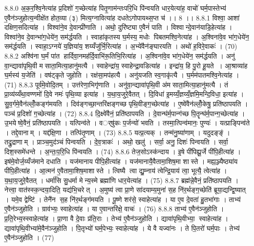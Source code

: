 8.8.0
अ॒क॒र॒श्वि॒नेत्या॑ह प्र॒दिशो॑ ग॒च्छेत्या॑ह पितृ॒णाम॑न्तःपरि॒धि पि॑न्वयति धार॒येत्या॑ह॒ वाचो॑ घर्म॒पास्तेभ्य॑ ए॒वैन॑ञ्जुहोत्य॒न्वीक्षे॑त होत॒व्या (३) मित्य॒ग्नावित्या॑ह दधतेऽगोपायथ्स॒प्त च॑ ।। 8 ।।
8.8.1
विश्वा॒ आशा॑ दक्षिण॒सदित्या॑ह । विश्वा॑ने॒व दे॒वान्प्री॑णाति । अथो॒ दुरि॑ष्ट्या ए॒वैनं॑ पाति । विश्वान्दे॒वान॑याडि॒हेत्या॑ह । विश्वा॑ने॒व दे॒वान्भा॑ग॒धेये॑न॒ सम॑र्द्धयति । स्वाहा॑कृतस्य घ॒र्मस्य॒ मधोः पिबतमश्वि॒नेत्या॑ह । अ॒श्विना॑वे॒व भा॑ग॒धेये॑न॒ सम॑र्द्धयति । स्वाहा॒ऽग्नये॑ य॒ज्ञिया॑य॒ शय्यँजु॑र्भि॒रित्या॑ह । अ॒भ्ये॑वैन॑ङ्घारयति । अथो॑ ह॒विरे॒वाकः॑ । (70)
8.8.2
अश्वि॑ना घ॒र्मं पा॑त हार्दिवा॒नमह॑र्दि॒वाभि॑रू॒तिभि॒रित्या॑ह । अ॒श्विना॑वे॒व भा॑ग॒धेये॑न॒ सम॑र्द्धयति । अनु॑ वा॒न्द्यावा॑पृथि॒वी मसाता॒मित्या॒हानु॑मत्यै । स्वाहेन्द्रा॑य॒ स्वाहेन्द्रा॒वडित्या॑ह । इन्द्रा॑य॒ हि पु॒रो हू॒यते । आ॒श्राव्या॑ह घ॒र्मस्य॑ य॒जेति॑ । वष॑ट्कृते जुहोति । रक्ष॑सा॒मप॑हत्यै । अनु॑यजति स्व॒गाकृ॑त्यै । घ॒र्मम॑पातमश्वि॒नेत्या॑ह । (71)
8.8.3
पूर्व॑मे॒वोदि॒तम् । उत्त॑रेणा॒भिगृ॑णाति । अनु॑वा॒न्द्यावा॑पृथि॒वी अ॑मसाता॒मित्या॒हानु॑मत्यै । तं प्रा॒व्य॑य्यँथा॒वण्णमो॑ दि॒वे नमः॑ पृथि॒व्या इत्या॑ह । य॒था॒य॒जुरे॒वैतत् । दि॒विधा॑ इ॒मय्यँ॒ज्ञय्यँ॒ज्ञमि॒मन्दि॒विधा॒ इत्या॑ह । सु॒व॒र्गमे॒वैन॑ल्लोँ॒कङ्ग॑मयति । दिव॑ङ्गच्छा॒न्तरि॑क्षङ्गच्छ पृथि॒वीङ्ग॒च्छेत्या॑ह । ए॒ष्वे॑वैन॑ल्लोँ॒केषु॒ प्रति॑ष्ठापयति । पञ्च॑ प्र॒दिशो॑ ग॒च्छेत्या॑ह । (72)
8.8.4
दि॒क्ष्वे॑वैनं॒ प्रति॑ष्ठापयति । दे॒वान्घ॑र्म॒पान्ग॑च्छ पि॒तॄन्घ॑र्म॒पान्ग॒च्छेत्या॑ह । उ॒भयेष्वे॒वैनं॒ प्रति॑ष्ठापयति । यत्पिन्व॑ते । वर््षु॑कः प॒र्जन्यो॑ भवति । तस्मा॒त्पिन्व॑मानः॒ पुण्यः॑ । यत्प्राङ्पिन्व॑ते । तद्दे॒वानाम् । यद्द॑क्षि॒णा । तत्पि॑तृ॒णाम् । (73)
8.8.5
यत्प्र॒त्यक् । तन्म॑नु॒ष्या॑णाम् । यदुदङ्ङ्॑ । तद्रु॒द्राणाम् । प्राञ्च॒मुद॑ञ्चं पिन्वयति । दे॒व॒त्राकः॑ । अथो॒ खलु॑ । सर्वा॒ अनु॒ दिशः॑ पिन्वयति । सर्वा॒ दिश॒स्समे॑धन्ते । अ॒न्तः॒प॒रि॒धि पि॑न्वयति । (74)
8.8.6
तेज॒सोऽस्क॑न्दाय । इ॒षे पी॑पिह्यू॒र्जे पी॑पि॒हीत्या॑ह । इष॑मे॒वोर्ज॒य्यँज॑माने दधाति । यज॑मानाय पीपि॒हीत्या॑ह । यज॑मानायै॒वैतामा॒शिष॒मा शास्ते । मह्य॒ञ्ज्यैष्ठ्या॑य पीपि॒हीत्या॑ह । आ॒त्मन॑ ए॒वैतामा॒शिष॒माशास्ते । त्विष्यै त्वा द्यु॒म्नाय॑ त्वेन्द्रि॒याय॑ त्वा॒ भूत्यै॒ त्वेत्या॑ह । य॒था॒य॒जुरे॒वैतत् । धर्मा॑सि सु॒धर्मा मेन्य॒स्मे ब्रह्मा॑णि धार॒येत्या॑ह । (75)
8.8.7
ब्रह्म॑न्ने॒वैनं॒ प्रति॑ष्ठापयति । नेत्त्वा॒ वात॑स्स्क॒न्दया॒दिति॒ यद्य॑भि॒चरेत् । अ॒मुष्य॑ त्वा प्रा॒णे सा॑दयाम्य॒मुना॑ स॒ह नि॑र॒र्थङ्ग॒च्छेति॑ ब्रूया॒द्यन्द्वि॒ष्यात् । यमे॒व द्वेष्टि॑ । तेनै॑न स॒ह नि॑र॒र्थङ्ग॑मयति । पू॒ष्णे शर॑से॒ स्वाहेत्या॑ह । या ए॒व दे॒वता॑ हु॒तभा॑गाः । ताभ्य॑ ए॒वैन॑ञ्जुहोति । ग्राव॑भ्यः॒ स्वाहेत्या॑ह । या ए॒वान्तरि॑क्षे॒ वाचः॑ । (76)
8.8.8
ताभ्य॑ ए॒वैन॑ञ्जुहोति । प्र॒ति॒रेभ्य॒स्स्वाहेत्या॑ह । प्रा॒णा वै दे॒वाः प्र॑ति॒राः । तेभ्य॑ ए॒वैन॑ञ्जुहोति । द्यावा॑पृथि॒वीभ्या॒ स्वाहेत्या॑ह । द्यावा॑पृथि॒वीभ्या॑मे॒वैन॑ञ्जुहोति । पि॒तृभ्यो॑ घर्म॒पेभ्यः॒ स्वाहेत्या॑ह । ये वै यज्वा॑नः । ते पि॒तरो॑ घर्म॒पाः । तेभ्य॑ ए॒वैन॑ञ्जुहोति । (77)
